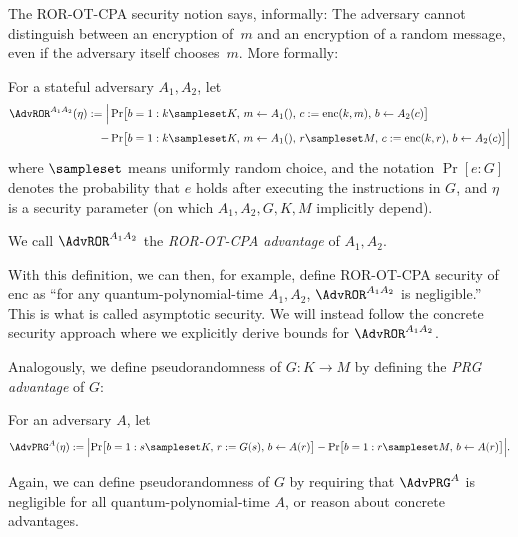 \documentclass{article}
\begin{document}
The ROR-OT-CPA security notion says,
informally: The adversary cannot distinguish between an encryption
of~$m$
and an encryption of a random message, even if the adversary
itself chooses~$m$. More formally:
\begin{definition}\label{def:roradv}
  For a stateful adversary $A_1,A_2$, let \symbolindexmark\AdvROR
  \begin{align*}
    \AdvROR^{A_1A_2}(\eta) :=
    \Bigl\lvert
    &\Pr\bigl[b=1:
        k\sampleset K,\, m\leftarrow A_1(),\, c:=\mathrm{enc}(k,m),\, b\leftarrow A_2(c)\bigr]
    \\    -
     &\Pr\bigl[b=1:
       k\sampleset K,\, m\leftarrow A_1(),\, r\sampleset M,\, c:=\mathrm{enc}(k,r),\, b\leftarrow A_2(c)\bigr]
       \Bigr\rvert      
  \end{align*}
  where \symbolindexmark\sampleset$\sampleset$
  means uniformly random choice, and the notation
  $\Pr[e:G]$
  denotes the probability that $e$
  holds after executing the instructions in $G$,
  and $\eta$
  is a security parameter (on which $A_1,A_2,G,K,M$
  implicitly depend).

  We call $\AdvROR^{A_1A_2}$ the \emph{ROR-OT-CPA advantage}%
  of $A_1,A_2$.
\end{definition}
With this definition, we can then, for example, define ROR-OT-CPA
security of $\mathrm{enc}$
as ``for any quantum-polynomial-time $A_1,A_2$,
$\AdvROR^{A_1A_2}$
is negligible.'' This is what is called asymptotic security. We will
instead follow the concrete security approach where we explicitly
derive bounds for $\AdvROR^{A_1A_2}$.

Analogously, we define pseudorandomness of $G:K\to M$ by defining the \emph{PRG advantage}%
%
 of $G$:
\begin{definition}\label{def:prg.adv}
  For an adversary $A$, let \symbolindexmark\AdvPRG
  \begin{equation*}
    \AdvPRG^{A}(\eta) :=
    \Bigl\lvert
    \Pr\bigl[b=1:
        s\sampleset K,\, r := G(s),\, b\leftarrow A(r)\bigr]
        -
    \Pr\bigl[b=1:
       r\sampleset M,\, b\leftarrow A(r)\bigr]
       \Bigr\rvert      .
  \end{equation*}
\end{definition}
Again, we can define pseudorandomness of $G$
by requiring that $\AdvPRG^A$
is negligible for all quantum-polynomial-time $A$,
or reason about concrete advantages.
\end{document}

